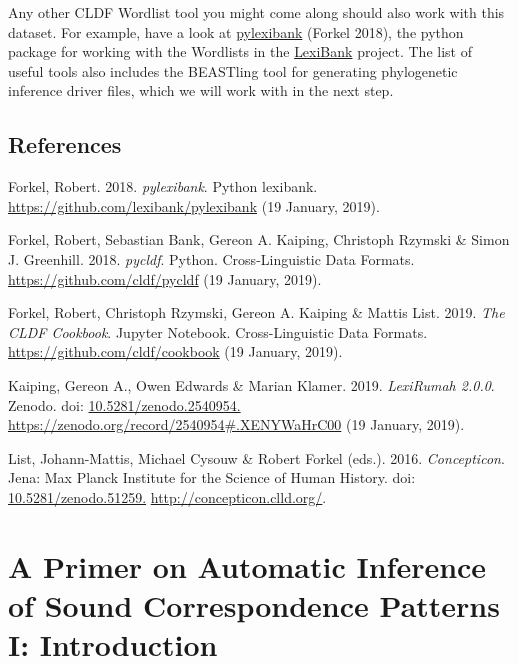 \documentclass[
  a4paper,
  14pt,
  oneside,
  tablecaptionabove
]{scrbook}
\begin{document}
Any other CLDF Wordlist tool you might come along should also work with
this dataset. For example, have a look at
\href{https://github.com/lexibank/pylexibank}{pylexibank} (Forkel 2018),
the python package for working with the Wordlists in the
\href{https://glottobank.org/\#lexibank}{LexiBank} project. The list of
useful tools also includes the BEASTling tool for generating
phylogenetic inference driver files, which we will work with in the next
step. 

\subsection*{References}

\nopagebreak\hangindent=0.7cm {\small Forkel, Robert. 2018. \emph{pylexibank}. Python lexibank.
\url{https://github.com/lexibank/pylexibank} (19 January, 2019). }

\nopagebreak\hangindent=0.7cm {\small Forkel, Robert, Sebastian Bank, Gereon A. Kaiping, Christoph Rzymski \&
Simon J. Greenhill. 2018. \emph{pycldf}. Python. Cross-Linguistic Data
Formats. \url{https://github.com/cldf/pycldf} (19 January, 2019). }

\nopagebreak\hangindent=0.7cm {\small Forkel, Robert, Christoph Rzymski, Gereon A. Kaiping \& Mattis List.
2019. \emph{The CLDF Cookbook}. Jupyter Notebook. Cross-Linguistic Data
Formats. \url{https://github.com/cldf/cookbook} (19 January, 2019). }

\nopagebreak\hangindent=0.7cm {\small Kaiping, Gereon A., Owen Edwards \& Marian Klamer. 2019. \emph{LexiRumah
2.0.0}. Zenodo. doi:
\href{https://doi.org/10.5281/zenodo.2540954.}{10.5281/zenodo.2540954.}
\url{https://zenodo.org/record/2540954\#.XENYWaHrC00} (19 January,
2019). }

\nopagebreak\hangindent=0.7cm {\small List, Johann-Mattis, Michael Cysouw \& Robert Forkel (eds.).
2016. \emph{Concepticon}. Jena: Max Planck Institute for the Science of
Human History. doi:
\href{https://doi.org/10.5281/zenodo.51259.}{10.5281/zenodo.51259.}
\url{http://concepticon.clld.org/}. }




\newpage
\section*{A Primer on Automatic Inference of Sound Correspondence
Patterns I: Introduction}
\end{document}
